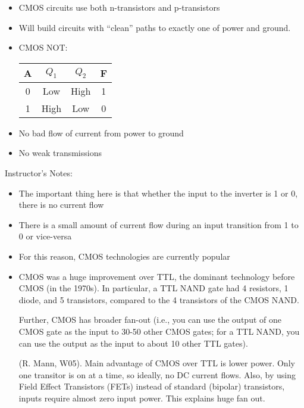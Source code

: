 \begin{frame}[fragile]
\begin{itemize}
	\item CMOS circuits use both n-transistors and p-transistors
	\item Will build circuits with ``clean'' paths to exactly
		one of power and ground.
	\item CMOS NOT:


		\begin{center}
		\begin{tabular}{c|cc|c}
		A & $Q_1$ & $Q_2$ & F\\\hline
		0 & Low & High & 1\\
		1 & High & Low & 0
		\end{tabular}
		\end{center}
	\item No bad flow of current from power to ground
        \item No weak transmissions
\end{itemize}
\end{frame}
\BNotes\ifnum{}
\begin{frame}[fragile]
Instructor's Notes:
\begin{itemize}
\item The important thing here is that whether the input to the inverter is 1 or 0, there is no current flow
\item There is a small amount of current flow during an input transition from 1 to 0 or vice-versa
\item For this reason, CMOS technologies are currently popular

\item CMOS was a huge improvement over TTL, the dominant technology before
	CMOS (in the 1970s).  In particular, a TTL NAND
	gate had 4 resistors, 1 diode, and 5 transistors, compared to
	the 4 transistors of the CMOS NAND.  

	Further, CMOS has broader
	fan-out (i.e., you can use the output of one CMOS gate as the
	input to 30-50 other CMOS gates; for a TTL NAND, you can use
	the output as the input to about 10 other TTL gates).

        (R. Mann, W05).  Main advantage of CMOS over TTL is lower power.  Only
        one transitor is on at a time, so ideally, no DC current flows.  Also,
        by using Field Effect Transistors (FETs) instead of standard (bipolar)
        transistors, inputs require almost zero input power.  This explains
        huge fan out.

\end{itemize}
\end{frame}
\fi\ENotes

